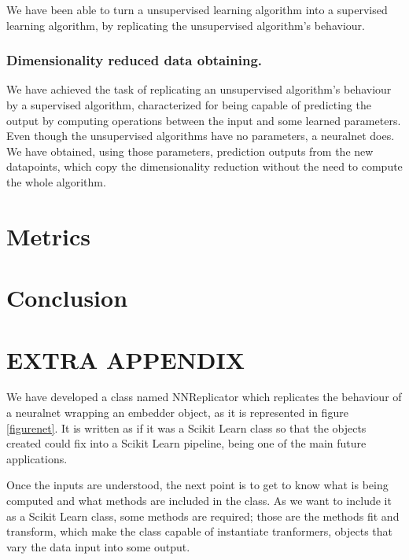 \documentclass[a4paper,11pt,spanish]{report}
\begin{document}
We have been able to turn a unsupervised learning algorithm into a supervised learning algorithm, by replicating the unsupervised algorithm's behaviour.

\subsection{Dimensionality reduced data obtaining.}
\label{ssec:trans}

We have achieved the task of replicating an unsupervised algorithm's behaviour by a supervised algorithm, characterized for being capable of predicting the output by computing operations between the input and some learned parameters.
Even though the unsupervised algorithms have no parameters, a neuralnet does. We have obtained, using those parameters, prediction outputs from the new datapoints, which copy the dimensionality reduction without the need to compute the whole algorithm.


\chapter{Metrics}
\label{chap:met}



\chapter{Conclusion}
\label{chap:conc}



\chapter{EXTRA APPENDIX}
\label{chap:append}

We have developed a class named NNReplicator which replicates the behaviour of a neuralnet wrapping an embedder object, as it is represented in figure \ref{figurenet}. It is written as if it was a Scikit Learn class so that the objects created could fix into a Scikit Learn pipeline, being one of the main future applications.

Once the inputs are understood, the next point is to get to know what is being computed and what methods are included in the class. As we want to include it as a Scikit Learn class, some methods are required; those are the methods fit and transform, which make the class capable of instantiate tranformers, objects that vary the data input into some output.
\end{document}
